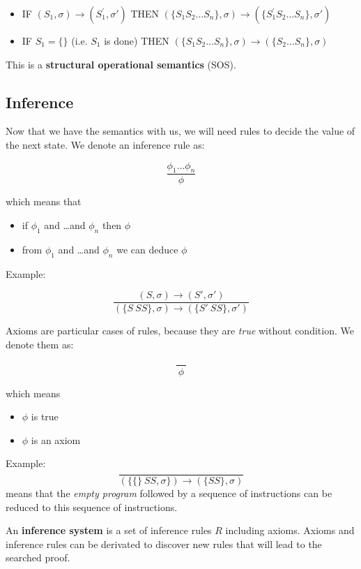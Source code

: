 \documentclass[12pt, a4paper]{book}
\begin{document}
\begin{itemize}
    \item IF $(S_1, \sigma) \longrightarrow (S_{1}^{'},\sigma')$ THEN
    $(\{S_1S_2\ldots S_n\}, \sigma) \longrightarrow (\{S_1^{'}S_2\ldots S_n\},\sigma')$
    \item IF $S_1 = \{\}$ (i.e. $S_1$ is done) THEN $(\{S_1S_2\ldots S_n\},\sigma) \longrightarrow (\{S_2\ldots S_n\}, \sigma)$
\end{itemize}

This is a \textbf{structural operational semantics} (SOS).

\subsection{Inference}
\label{sub:Inference}

Now that we have the semantics with us, we will need rules to decide the value
of the next state. We denote an inference rule as:

$$\frac{\phi_{1} \ldots \phi_{n}}{\phi}$$

which means that

\begin{itemize}
    \item if $\phi_1$ and \ldots and $\phi_n$ then $\phi$
    \item from $\phi_1$ and \ldots and $\phi_n$ we can deduce $\phi$
\end{itemize}

Example:

$$
\frac{(S,\sigma) \longrightarrow (S', \sigma')}
{(\{S\ SS\},\sigma) \longrightarrow (\{S'\ SS\}, \sigma')}
$$

Axioms are particular cases of rules, because they are \textit{true} without
condition. We denote them as:

$$
\frac{}
{\ \phi \ }
$$

which means

\begin{itemize}
    \item $\phi$ is true
    \item $\phi$ is an axiom
\end{itemize}

Example:
$$
\frac{}
{(\{ \{ \} \ SS, \sigma \}) \longrightarrow (\{ SS \}, \sigma)}
$$
means that the \textit{empty program} followed by a sequence of instructions can
be reduced to this sequence of instructions. \newline

An \textbf{inference system} is a set of inference rules $R$ including axioms.
Axioms and inference rules can be derivated to discover new rules that will lead
to the searched proof. \newline
\end{document}
